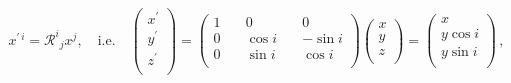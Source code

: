 \documentclass[aps,prd]{revtex4-2}
\begin{document}
\begin{eqnarray}\label{eq:coordinate-rotation}
x^{\prime\,i} = \mathcal{R}^{i}{}_{j} x^j, \quad \text{i.e.} \quad
    \begin{pmatrix}
    x^{\prime}\\ y^{\prime} \\ z^{\prime} \\
    \end{pmatrix}
     = \begin{pmatrix}
     1\quad & 0\quad & 0 \\
     0\quad & \cos{i}\quad & - \sin{i} \\
     0\quad & \sin{i}\quad & \cos{i} \\
     \end{pmatrix}
     \begin{pmatrix}
         x \\
         y \\
         z \\
     \end{pmatrix}
     = \begin{pmatrix}
         x \\ 
         y \cos{i} \\
         y \sin{i} \\
     \end{pmatrix}\,,
\end{eqnarray}
\end{document}
